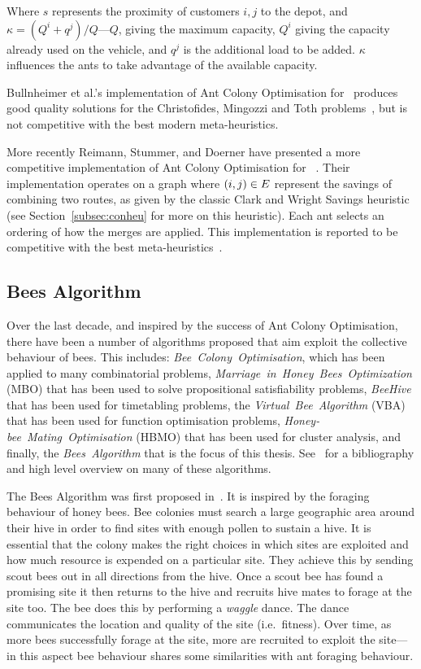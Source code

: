 Where $s$ represents the proximity of customers $i, j$ to the depot, and $\kappa = (Q^i + q^j) / Q$---$Q$, giving the maximum capacity, $Q^i$ giving the capacity already used on the vehicle, and $q^j$ is the additional load to be added. $\kappa$ influences the ants to take advantage of the available capacity. 

Bullnheimer et al.'s implementation of Ant Colony Optimisation for \VRP\ produces good quality solutions for the Christofides, Mingozzi and Toth problems~\cite{CMT:1981}, but is not competitive with the best modern meta-heuristics.

More recently Reimann, Stummer, and Doerner have presented a more competitive implementation of Ant Colony Optimisation for \VRP~\cite{RSD:2002}. Their implementation operates on a graph where $(i,j) \in E$ represent the savings of combining two routes, as given by the classic Clark and Wright Savings heuristic (see Section~\ref{subsec:conheu} for more on this heuristic). Each ant selects an ordering of how the merges are applied. This implementation is reported to be competitive with the best meta-heuristics~\cite{Potvin:2009}.   

\subsection{Bees Algorithm}
\label{subsec:beesalgorithm}

Over the last decade, and inspired by the success of Ant Colony Optimisation, there have been a number of algorithms proposed that aim exploit the collective behaviour of bees. This includes: \emph{Bee~Colony~Optimisation}, which has been applied to many combinatorial problems, \emph{Marriage~in~Honey~Bees~Optimization} (MBO) that has been used to solve propositional satisfiability problems, \emph{BeeHive} that has been used for timetabling problems, the \emph{Virtual~Bee~Algorithm} (VBA) that has been used for function optimisation problems, \emph{Honey-bee~Mating~Optimisation} (HBMO) that has been used for cluster analysis, and finally, the \emph{Bees~Algorithm} that is the focus of this thesis. See~\cite{LJDS:2009} for a bibliography and high level overview on many of these algorithms. 

The Bees Algorithm was first proposed in~\cite{PGKORZ:2005}. It is inspired by the foraging behaviour of honey bees. Bee colonies must search a large geographic area around their hive in order to find sites with enough pollen to sustain a hive. It is essential that the colony makes the right choices in which sites are exploited and how much resource is expended on a particular site. They achieve this by sending scout bees out in all directions from the hive. Once a scout bee has found a promising site it then returns to the hive and recruits hive mates to forage at the site too. The bee does this by performing a \emph{waggle} dance. The dance communicates the location and quality of the site (i.e.~fitness). Over time, as more bees successfully forage at the site, more are recruited to exploit the site---in this aspect bee behaviour shares some similarities with ant foraging behaviour. 


